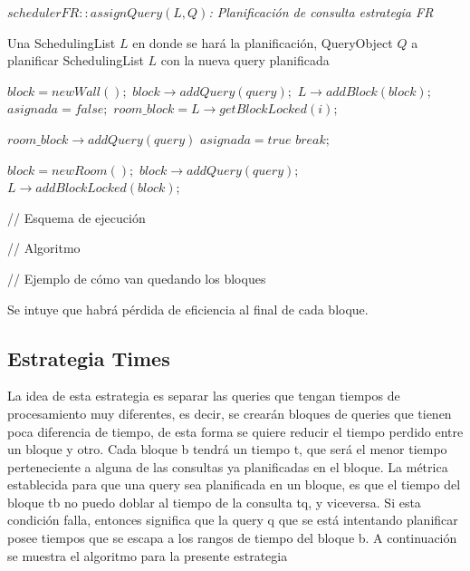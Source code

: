 \begin{algorithm}[!th]
\caption{\em $schedulerFR::assignQuery(L, Q)$: Planificación de consulta estrategia FR}
\label{alg:fr}
\begin{algorithmic}[1]
\REQUIRE Una SchedulingList $L$ en donde se hará la planificación, QueryObject $Q$ a planificar
\ENSURE SchedulingList $L$ con la nueva query planificada

	\STATE $block = new Wall();$
	\STATE $block \rightarrow addQuery(query);$
	\STATE $L \rightarrow addBlock(block);$
\ELSE
	\STATE $asignada = false;$
		\STATE $room\_block = L \rightarrow getBlockLocked(i);$
		
			\STATE $room\_block \rightarrow addQuery(query)$
			\STATE $asignada = true$
			\STATE $break;$
		\ENDIF
	\ENDFOR
	
		\STATE $block = new Room();$
		\STATE $block \rightarrow addQuery(query);$
		\STATE $L \rightarrow addBlockLocked(block);$		
	\ENDIF
\ENDIF

\end{algorithmic}
\end{algorithm}


// Esquema de ejecución

// Algoritmo

// Ejemplo de cómo van quedando los bloques

Se intuye que habrá pérdida de eficiencia al final de cada bloque. 


\subsection{Estrategia Times}
\label{scheduling:times}
La idea de esta estrategia es separar las queries que tengan tiempos de procesamiento muy diferentes, es decir, se crearán bloques de queries que tienen poca diferencia de tiempo, de esta forma se quiere reducir el tiempo perdido entre un bloque y otro. Cada bloque b tendrá un tiempo t, que será el menor tiempo perteneciente a alguna de las consultas ya planificadas en el bloque. La métrica establecida para que una query sea planificada en un bloque, es que el tiempo del bloque tb no puedo doblar al tiempo de la consulta tq, y viceversa. Si esta condición falla, entonces significa que la query q que se está intentando planificar posee tiempos que se escapa a los rangos de tiempo del bloque b. A continuación se muestra el algoritmo para la presente estrategia

